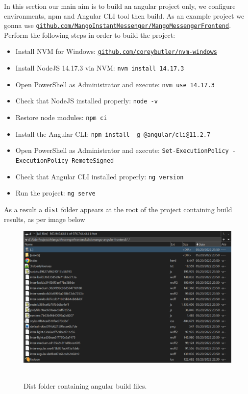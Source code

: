 In this section our main aim is to build an angular project only, we configure environments, npm and Angular CLI tool
then build.
As an example project we gonna use
\href{https://github.com/MangoInstantMessenger/MangoMessengerFrontend}
{\texttt{github.com/MangoInstantMessenger/MangoMessengerFrontend}}.
Perform the following steps in order to build the project:
\begin{itemize}
    \item Install NVM for Windows: \href{https://github.com/coreybutler/nvm-windows}{\texttt{github.com/coreybutler/nvm-windows}}
    \item Install NodeJS 14.17.3 via NVM: \texttt{nvm install 14.17.3}
    \item Open PowerShell as Administrator and execute: \texttt{nvm use 14.17.3}
    \item Check that NodeJS installed properly: \texttt{node -v}
    \item Restore node modules: \texttt{npm ci}
    \item Install the Angular CLI: \texttt{npm install -g @angular/cli@11.2.7}
    \item Open PowerShell as Administrator and execute: \texttt{Set-ExecutionPolicy -ExecutionPolicy RemoteSigned}
    \item Check that Angular CLI installed properly: \texttt{ng version}
    \item Run the project: \texttt{ng serve}
\end{itemize}
As a result a \texttt{dist} folder appears at the root of the project containing build results, as per image below
\begin{figure}[H]
    \centering
    \includegraphics[width=1\textwidth]{img/08_build_angular_project}
    ~\caption{Dist folder containing angular build files.}\label{fig:figure24}
\end{figure}